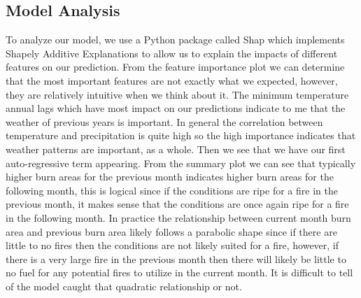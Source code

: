 \documentclass[12pt]{article}
\begin{document}
\subsection{\textrm{Model Analysis}}

To analyze our model, we use a Python package called Shap which implements Shapely Additive Explanations to allow us to explain the impacts of different features on our prediction. From the feature importance plot we can determine that the most important features are not exactly what we expected, however, they are relatively intuitive when we think about it. The minimum temperature annual lags which have most impact on our predictions indicate to me that the weather of previous years is important. In general the correlation between temperature and precipitation is quite high so the high importance indicates that weather patterns are important, as a whole. Then we see that we have our first auto-regressive term appearing. From the summary plot we can see that typically higher burn areas for the previous month indicates higher burn areas for the following month, this is logical since if the conditions are ripe for a fire in the previous month, it makes sense that the conditions are once again ripe for a fire in the following month. In practice the relationship between current month burn area and previous burn area likely follows a parabolic shape since if there are little to no fires then the conditions are not likely suited for a fire, however, if there is a very large fire in the previous month then there will likely be little to no fuel for any potential fires to utilize in the current month. It is difficult to tell of the model caught that quadratic relationship or not. \\
\end{document}
